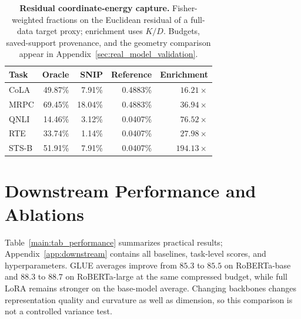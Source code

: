 \begin{table}[t]
 \centering\small
 \caption{\textbf{Residual coordinate-energy capture.} Fisher-weighted fractions on the Euclidean residual of a full-data target proxy; enrichment uses $K/D$. Budgets, saved-support provenance, and the geometry comparison appear in Appendix~\ref{sec:real_model_validation}.}
 \label{main:tab_recovery}
 \begin{tabular}{lrrrr}
 \toprule
 Task & Oracle & SNIP & Reference & Enrichment \\
 \midrule
CoLA & 49.87\% & 7.91\% & 0.4883\% & $16.21\times$ \\
MRPC & 69.45\% & 18.04\% & 0.4883\% & $36.94\times$ \\
QNLI & 14.46\% & 3.12\% & 0.0407\% & $76.52\times$ \\
RTE & 33.74\% & 1.14\% & 0.0407\% & $27.98\times$ \\
STS-B & 51.91\% & 7.91\% & 0.0407\% & $194.13\times$ \\
 \bottomrule
 \end{tabular}
\end{table}

\section{Downstream Performance and Ablations}
\label{main:downstream}
Table~\ref{main:tab_performance} summarizes practical results; Appendix~\ref{app:downstream} contains all baselines, task-level scores, and hyperparameters. GLUE averages improve from $85.3$ to $85.5$ on RoBERTa-base and $88.3$ to $88.7$ on RoBERTa-large at the same compressed budget, while full LoRA remains stronger on the base-model average. Changing backbones changes representation quality and curvature as well as dimension, so this comparison is not a controlled variance test.

